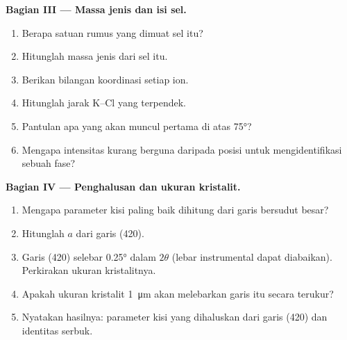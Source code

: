 \begin{problem}
\medskip\noindent\textbf{Bagian III --- Massa jenis dan isi sel.}
\begin{enumerate}[resume, beginpenalty=10000]
  \item Berapa satuan rumus yang dimuat sel itu?
  \item Hitunglah massa jenis dari sel itu.
  \item Berikan bilangan koordinasi setiap ion.
  \item Hitunglah jarak K--Cl yang terpendek.
  \item Pantulan apa yang akan muncul pertama di atas \ang{75}?
  \item Mengapa intensitas kurang berguna daripada posisi untuk
        mengidentifikasi sebuah fase?
\end{enumerate}

\medskip\noindent\textbf{Bagian IV --- Penghalusan dan ukuran kristalit.}
\begin{enumerate}[resume, beginpenalty=10000]
  \item Mengapa parameter kisi paling baik dihitung dari garis bersudut besar?
  \item Hitunglah $a$ dari garis (420).
  \item Garis (420) selebar \ang{0.25} dalam $2\theta$ (lebar instrumental dapat
        diabaikan). Perkirakan ukuran kristalitnya.
  \item Apakah ukuran kristalit \qty{1}{\micro m} akan melebarkan garis itu
        secara terukur?
  \item Nyatakan hasilnya: parameter kisi yang dihaluskan dari garis (420)
        dan identitas serbuk.
\end{enumerate}
\end{problem}
